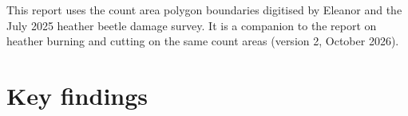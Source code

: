 \documentclass[11pt,a4paper]{article}
\begin{document}
\begin{titlepage}
\begin{tcolorbox}[enhanced,colback=accentlight,colframe=accentlight,arc=1.5pt,left=11pt,right=11pt,top=9pt,bottom=9pt]
\end{tcolorbox}
\vspace{0.5cm}
{\small\color{muted}This report uses the count area polygon boundaries digitised by Eleanor and the July 2025 heather beetle damage survey. It is a companion to the report on heather burning and cutting on the same count areas (version 2, October 2026).\par}
\restoregeometry
\end{titlepage}

\thispagestyle{plain}
\tableofcontents
\clearpage
\restoregeometry
{}

\section*{Key findings}
\end{document}
